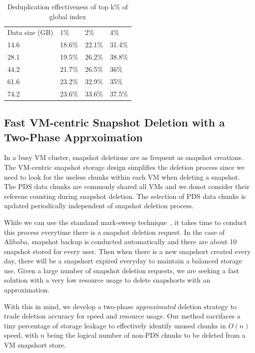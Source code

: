 {\begin{table}
    \begin{tabular}{llll}
    Data size (GB) & 1\%    & 2\%    & 4\%    \\
    14.6           & 18.6\% & 22.1\% & 31.4\% \\
    28.1           & 19.5\% & 26.2\% & 38.8\% \\
    44.2           & 21.7\% & 26.5\% & 36\%   \\
    61.6           & 23.2\% & 32.9\% & 35\%   \\
    74.2           & 23.6\% & 33.6\% & 37.5\% \\
    \end{tabular}
    \caption{Deduplication effectiveness of top k\% of global index}
    \label{tab:cds}
\end{table}

}

\subsection{Fast VM-centric Snapshot Deletion with a Two-Phase  Apprxoimation}

In a busy VM cluster, snapshot deletions are as frequent as snapshot creations.
The VM-centric snapshot storage design simplifies the deletion process since we need to look
for the useless chunks within each VM when deleting a snapshot.
The PDS data chunks are commonly shared all VMs and we donot consider their referene
counting  during snapshot deletion.
The selection of PDS data chunks   is updated periodically independent of snapshot deletion process.

While we can use the standand mark-sweep technique~\cite{mark-sweep}, 
it takes time to conduct this process everytime there is a snapshot deletion request.
In the case of Alibaba, snapshot backup is conducted automatically and there are 
about 10 snapshot stored for  every user. Then when there is
a new snapshort created every day,  there will be  a snapshort expired everyday to maintain
a balanced storage use. Given a large number of snapshot deletion requests, we are seeking
a fast solution with a very low resource usage to delete snapshorts with an approximation.

With this in mind, we develop a two-phase {\em approximated} deletion strategy to trade deletion accuracy for
speed and resource usage. Our method sacrifaces a tiny percentage of storage leakage
to effectively identify unused chunks in $O(n)$ speed, with $n$ being the logical number of non-PDS chunks 
to be deleted from a VM snapshort store.


